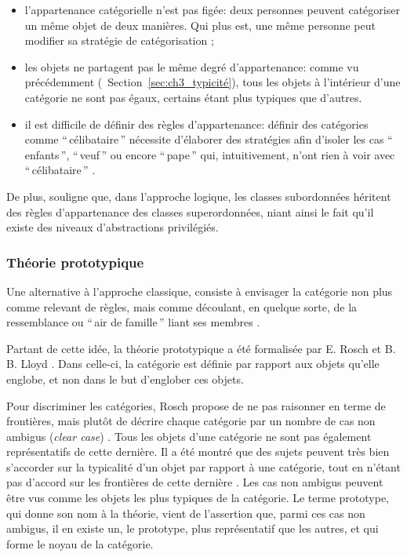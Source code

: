\begin{itemize}
\item l'appartenance catégorielle n'est pas figée: deux personnes peuvent catégoriser un même objet de deux manières. Qui plus est, une même personne peut modifier sa stratégie de catégorisation \citep{mccloskey1978natural};
\item les objets ne partagent pas le même degré d'appartenance: comme vu précédemment (\cf~Section~\ref{sec:ch3_typicité}), tous les objets à l'intérieur d'une catégorie ne sont pas égaux, certains étant plus typiques que d'autres.
\item il est difficile de définir des règles d'appartenance: définir des catégories comme ``\,célibataire\,'' nécessite d'élaborer des stratégies afin d'isoler les cas ``\,enfants\,'', ``\,veuf\,'' ou encore ``\,pape\,'' qui, intuitivement, n'ont rien à voir avec ``\,célibataire\,'' . 
\end{itemize}

De plus, \citep[49]{Houix03f} souligne que, dans l'approche logique, les classes subordonnées héritent des règles d'appartenance des classes superordonnées, niant ainsi le fait qu'il existe des niveaux d'abstractions privilégiés. 

\subsubsection{Théorie prototypique}

Une alternative à l'approche classique, consiste à envisager la catégorie non plus comme relevant de règles, mais comme découlant, en quelque sorte, de la ressemblance ou ``\,air de famille\,'' liant ses membres \citep{ludwig1953philosophical}.

Partant de cette idée, la théorie prototypique a été formalisée par E. Rosch et B. B. Lloyd \citep{rosch1978cognition}. Dans celle-ci, la catégorie est définie par rapport aux objets qu'elle englobe, et non dans le but d'englober ces objets.

Pour discriminer les catégories, Rosch propose de ne pas raisonner en terme de frontières, mais plutôt de décrire chaque catégorie par un nombre de cas non ambigus (\emph{clear case}) \citep[p. 36]{rosch1978cognition}. Tous les objets d'une catégorie ne sont pas également représentatifs de cette dernière. Il a été montré que des sujets peuvent très bien s'accorder sur la typicalité d'un objet par rapport à une catégorie, tout en n'étant pas d'accord sur les frontières de cette dernière \citep{rosch1974human,rosch1975cognitive}. Les cas non ambigus peuvent être vus comme les objets les plus typiques de la catégorie. Le terme prototype, qui donne son nom à la théorie, vient de l'assertion que, parmi ces cas non ambigus, il en existe un, le prototype, plus représentatif que les autres, et qui forme le noyau de la catégorie.

